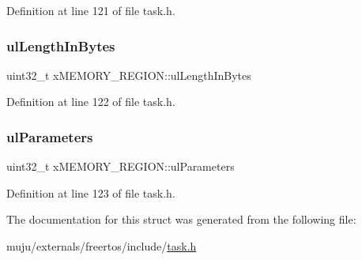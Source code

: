 Definition at line 121 of file task.\+h.

\mbox{\label{structx_m_e_m_o_r_y___r_e_g_i_o_n_a97e59578d3c4c46270d33e7206258a65}} 
\subsubsection{\texorpdfstring{ul\+Length\+In\+Bytes}{ulLengthInBytes}}
{\footnotesize\ttfamily uint32\+\_\+t x\+M\+E\+M\+O\+R\+Y\+\_\+\+R\+E\+G\+I\+O\+N\+::ul\+Length\+In\+Bytes}



Definition at line 122 of file task.\+h.

\mbox{\label{structx_m_e_m_o_r_y___r_e_g_i_o_n_a6ba180553e9a318f23acc5f4664934e3}} 
\subsubsection{\texorpdfstring{ul\+Parameters}{ulParameters}}
{\footnotesize\ttfamily uint32\+\_\+t x\+M\+E\+M\+O\+R\+Y\+\_\+\+R\+E\+G\+I\+O\+N\+::ul\+Parameters}



Definition at line 123 of file task.\+h.



The documentation for this struct was generated from the following file\+:\begin{DoxyCompactItemize}
\item 
muju/externals/freertos/include/\hyperlink{externals_2freertos_2include_2task_8h}{task.\+h}\end{DoxyCompactItemize}

